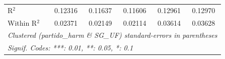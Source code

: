 \begin{tabular}{lccccc}
   R$^2$                                     & 0.12316               & 0.11637                & 0.11606         & 0.12961            & 0.12970\\  
   Within R$^2$                              & 0.02371               & 0.02149                & 0.02114         & 0.03614            & 0.03628\\  
   \midrule \midrule
   \multicolumn{6}{l}{\emph{Clustered (partido\_harm \& SG\_UF) standard-errors in parentheses}}\\
   \multicolumn{6}{l}{\emph{Signif. Codes: ***: 0.01, **: 0.05, *: 0.1}}\\
\end{tabular}
\par\endgroup


